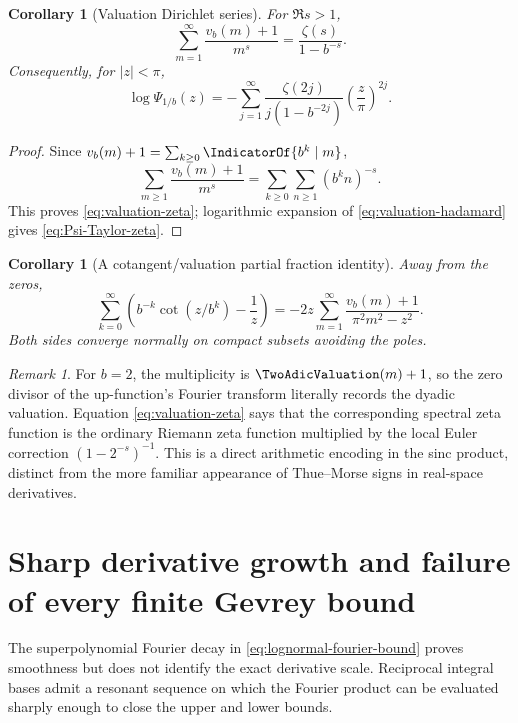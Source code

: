 \documentclass[11pt,oneside]{article}
\newtheorem{corollary}[theorem]{Corollary}
\theoremstyle{definition}
\theoremstyle{remark}
\newtheorem{remark}[theorem]{Remark}
\begin{document}
\begin{corollary}[Valuation Dirichlet series]
For $\Re s>1$,
\begin{equation}
 \sum_{m=1}^{\infty}\frac{v_b(m)+1}{m^s}
 =\frac{\zeta(s)}{1-b^{-s}}.
 \label{eq:valuation-zeta}
\end{equation}
Consequently, for $|z|<\pi$,
\begin{equation}
 \log\Psi_{1/b}(z)
 =-\sum_{j=1}^{\infty}
 \frac{\zeta(2j)}{j(1-b^{-2j})}
 \left(\frac z\pi\right)^{2j}.
 \label{eq:Psi-Taylor-zeta}
\end{equation}
\end{corollary}

\begin{proof}
Since $v_b(m)+1=\sum_{k\ge0}\IndicatorOf{b^k\mid m}$,
\[
 \sum_{m\ge1}\frac{v_b(m)+1}{m^s}
 =\sum_{k\ge0}\sum_{n\ge1}(b^kn)^{-s}.
\]
This proves \eqref{eq:valuation-zeta}; logarithmic expansion of
\eqref{eq:valuation-hadamard} gives \eqref{eq:Psi-Taylor-zeta}.
\end{proof}

\begin{corollary}[A cotangent/valuation partial fraction identity]
Away from the zeros,
\begin{equation}
 \sum_{k=0}^{\infty}
 \left(b^{-k}\cot(z/b^k)-\frac1z\right)
 =-2z\sum_{m=1}^{\infty}
 \frac{v_b(m)+1}{\pi^2m^2-z^2}.
 \label{eq:cotangent-valuation}
\end{equation}
Both sides converge normally on compact subsets avoiding the poles.
\end{corollary}

\begin{remark}
For $b=2$, the multiplicity is $\TwoAdicValuation(m)+1$, so the zero divisor of the up-function's
Fourier transform literally records the dyadic valuation.  Equation
\eqref{eq:valuation-zeta} says that the corresponding spectral zeta function is the
ordinary Riemann zeta function multiplied by the local Euler correction
$(1-2^{-s})^{-1}$.  This is a direct arithmetic encoding in the sinc product, distinct
from the more familiar appearance of Thue--Morse signs in real-space derivatives.
\end{remark}

\section{Sharp derivative growth and failure of every finite Gevrey bound}
\label{sec:gevrey}

The superpolynomial Fourier decay in \eqref{eq:lognormal-fourier-bound} proves
smoothness but does not identify the exact derivative scale.  Reciprocal integral bases
admit a resonant sequence on which the Fourier product can be evaluated sharply enough
to close the upper and lower bounds.
\end{document}
